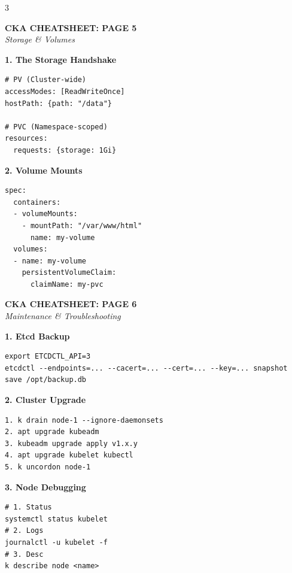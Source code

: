 \documentclass[10pt,landscape]{article}
\newcommand{\sectionheader}[1]{%
    \vspace{2pt}\noindent\colorbox{blue!15}{\parbox{\dimexpr\linewidth-2\fboxsep}{%
    \textbf{#1}}}\vspace{2pt}%
}
\begin{document}
\begin{multicols*}{3}
\columnbreak

\begin{center}\textbf{\Large CKA CHEATSHEET: PAGE 5}\\\textit{Storage \& Volumes}\end{center}

\sectionheader{1. The Storage Handshake}
\begin{lstlisting}
# PV (Cluster-wide)
accessModes: [ReadWriteOnce]
hostPath: {path: "/data"}

# PVC (Namespace-scoped)
resources:
  requests: {storage: 1Gi}
\end{lstlisting}

\sectionheader{2. Volume Mounts}
\begin{lstlisting}
spec:
  containers:
  - volumeMounts:
    - mountPath: "/var/www/html"
      name: my-volume
  volumes:
  - name: my-volume
    persistentVolumeClaim:
      claimName: my-pvc
\end{lstlisting}

\columnbreak

\begin{center}\textbf{\Large CKA CHEATSHEET: PAGE 6}\\\textit{Maintenance \& Troubleshooting}\end{center}

\sectionheader{1. Etcd Backup}
\begin{lstlisting}
export ETCDCTL_API=3
etcdctl --endpoints=... --cacert=... --cert=... --key=... snapshot save /opt/backup.db
\end{lstlisting}

\sectionheader{2. Cluster Upgrade}
\begin{lstlisting}
1. k drain node-1 --ignore-daemonsets
2. apt upgrade kubeadm
3. kubeadm upgrade apply v1.x.y
4. apt upgrade kubelet kubectl
5. k uncordon node-1
\end{lstlisting}

\sectionheader{3. Node Debugging}
\begin{lstlisting}
# 1. Status
systemctl status kubelet
# 2. Logs
journalctl -u kubelet -f
# 3. Desc
k describe node <name>
\end{lstlisting}

\end{multicols*}
\end{document}

